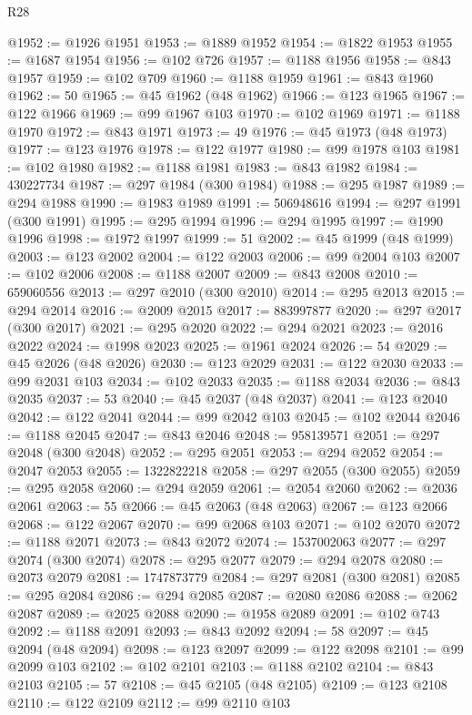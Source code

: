 \begin{lexlean}{R28}
\begin{coremodule}
@1952 := @1926 @1951
@1953 := @1889 @1952
@1954 := @1822 @1953
@1955 := @1687 @1954
@1956 := @102 @726
@1957 := @1188 @1956
@1958 := @843 @1957
@1959 := @102 @709
@1960 := @1188 @1959
@1961 := @843 @1960
@1962 := 50
@1965 := @45 @1962 (@48 @1962)
@1966 := @123 @1965
@1967 := @122 @1966
@1969 := @99 @1967 @103
@1970 := @102 @1969
@1971 := @1188 @1970
@1972 := @843 @1971
@1973 := 49
@1976 := @45 @1973 (@48 @1973)
@1977 := @123 @1976
@1978 := @122 @1977
@1980 := @99 @1978 @103
@1981 := @102 @1980
@1982 := @1188 @1981
@1983 := @843 @1982
@1984 := 430227734
@1987 := @297 @1984 (@300 @1984)
@1988 := @295 @1987
@1989 := @294 @1988
@1990 := @1983 @1989
@1991 := 506948616
@1994 := @297 @1991 (@300 @1991)
@1995 := @295 @1994
@1996 := @294 @1995
@1997 := @1990 @1996
@1998 := @1972 @1997
@1999 := 51
@2002 := @45 @1999 (@48 @1999)
@2003 := @123 @2002
@2004 := @122 @2003
@2006 := @99 @2004 @103
@2007 := @102 @2006
@2008 := @1188 @2007
@2009 := @843 @2008
@2010 := 659060556
@2013 := @297 @2010 (@300 @2010)
@2014 := @295 @2013
@2015 := @294 @2014
@2016 := @2009 @2015
@2017 := 883997877
@2020 := @297 @2017 (@300 @2017)
@2021 := @295 @2020
@2022 := @294 @2021
@2023 := @2016 @2022
@2024 := @1998 @2023
@2025 := @1961 @2024
@2026 := 54
@2029 := @45 @2026 (@48 @2026)
@2030 := @123 @2029
@2031 := @122 @2030
@2033 := @99 @2031 @103
@2034 := @102 @2033
@2035 := @1188 @2034
@2036 := @843 @2035
@2037 := 53
@2040 := @45 @2037 (@48 @2037)
@2041 := @123 @2040
@2042 := @122 @2041
@2044 := @99 @2042 @103
@2045 := @102 @2044
@2046 := @1188 @2045
@2047 := @843 @2046
@2048 := 958139571
@2051 := @297 @2048 (@300 @2048)
@2052 := @295 @2051
@2053 := @294 @2052
@2054 := @2047 @2053
@2055 := 1322822218
@2058 := @297 @2055 (@300 @2055)
@2059 := @295 @2058
@2060 := @294 @2059
@2061 := @2054 @2060
@2062 := @2036 @2061
@2063 := 55
@2066 := @45 @2063 (@48 @2063)
@2067 := @123 @2066
@2068 := @122 @2067
@2070 := @99 @2068 @103
@2071 := @102 @2070
@2072 := @1188 @2071
@2073 := @843 @2072
@2074 := 1537002063
@2077 := @297 @2074 (@300 @2074)
@2078 := @295 @2077
@2079 := @294 @2078
@2080 := @2073 @2079
@2081 := 1747873779
@2084 := @297 @2081 (@300 @2081)
@2085 := @295 @2084
@2086 := @294 @2085
@2087 := @2080 @2086
@2088 := @2062 @2087
@2089 := @2025 @2088
@2090 := @1958 @2089
@2091 := @102 @743
@2092 := @1188 @2091
@2093 := @843 @2092
@2094 := 58
@2097 := @45 @2094 (@48 @2094)
@2098 := @123 @2097
@2099 := @122 @2098
@2101 := @99 @2099 @103
@2102 := @102 @2101
@2103 := @1188 @2102
@2104 := @843 @2103
@2105 := 57
@2108 := @45 @2105 (@48 @2105)
@2109 := @123 @2108
@2110 := @122 @2109
@2112 := @99 @2110 @103

\end{coremodule}
\end{lexlean}
